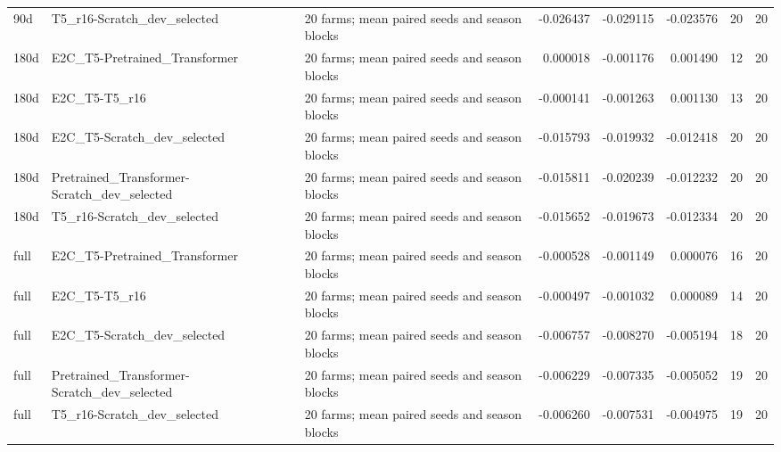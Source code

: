 \begin{tabular}{lllrrrrr}
90d & T5\_r16-Scratch\_dev\_selected & 20 farms; mean paired seeds and season blocks & -0.026437 & -0.029115 & -0.023576 & 20 & 20 \\
180d & E2C\_T5-Pretrained\_Transformer & 20 farms; mean paired seeds and season blocks & 0.000018 & -0.001176 & 0.001490 & 12 & 20 \\
180d & E2C\_T5-T5\_r16 & 20 farms; mean paired seeds and season blocks & -0.000141 & -0.001263 & 0.001130 & 13 & 20 \\
180d & E2C\_T5-Scratch\_dev\_selected & 20 farms; mean paired seeds and season blocks & -0.015793 & -0.019932 & -0.012418 & 20 & 20 \\
180d & Pretrained\_Transformer-Scratch\_dev\_selected & 20 farms; mean paired seeds and season blocks & -0.015811 & -0.020239 & -0.012232 & 20 & 20 \\
180d & T5\_r16-Scratch\_dev\_selected & 20 farms; mean paired seeds and season blocks & -0.015652 & -0.019673 & -0.012334 & 20 & 20 \\
full & E2C\_T5-Pretrained\_Transformer & 20 farms; mean paired seeds and season blocks & -0.000528 & -0.001149 & 0.000076 & 16 & 20 \\
full & E2C\_T5-T5\_r16 & 20 farms; mean paired seeds and season blocks & -0.000497 & -0.001032 & 0.000089 & 14 & 20 \\
full & E2C\_T5-Scratch\_dev\_selected & 20 farms; mean paired seeds and season blocks & -0.006757 & -0.008270 & -0.005194 & 18 & 20 \\
full & Pretrained\_Transformer-Scratch\_dev\_selected & 20 farms; mean paired seeds and season blocks & -0.006229 & -0.007335 & -0.005052 & 19 & 20 \\
full & T5\_r16-Scratch\_dev\_selected & 20 farms; mean paired seeds and season blocks & -0.006260 & -0.007531 & -0.004975 & 19 & 20 \\
\bottomrule
\end{tabular}
